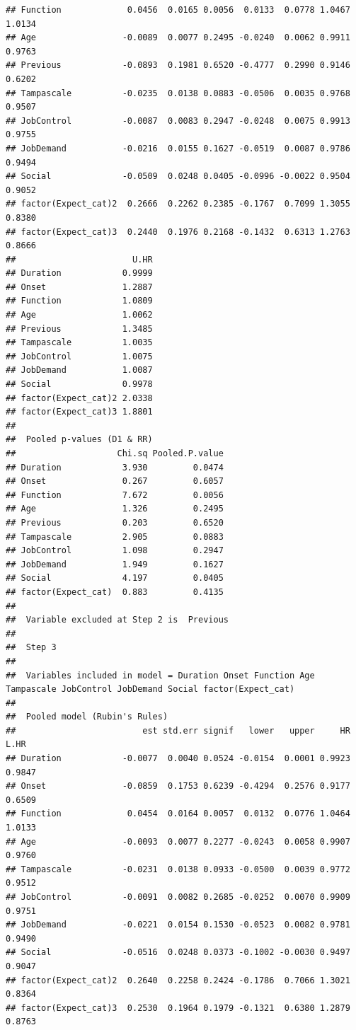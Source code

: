 \documentclass[]{book}
\begin{document}
\begin{verbatim}
## Function             0.0456  0.0165 0.0056  0.0133  0.0778 1.0467 1.0134
## Age                 -0.0089  0.0077 0.2495 -0.0240  0.0062 0.9911 0.9763
## Previous            -0.0893  0.1981 0.6520 -0.4777  0.2990 0.9146 0.6202
## Tampascale          -0.0235  0.0138 0.0883 -0.0506  0.0035 0.9768 0.9507
## JobControl          -0.0087  0.0083 0.2947 -0.0248  0.0075 0.9913 0.9755
## JobDemand           -0.0216  0.0155 0.1627 -0.0519  0.0087 0.9786 0.9494
## Social              -0.0509  0.0248 0.0405 -0.0996 -0.0022 0.9504 0.9052
## factor(Expect_cat)2  0.2666  0.2262 0.2385 -0.1767  0.7099 1.3055 0.8380
## factor(Expect_cat)3  0.2440  0.1976 0.2168 -0.1432  0.6313 1.2763 0.8666
##                       U.HR
## Duration            0.9999
## Onset               1.2887
## Function            1.0809
## Age                 1.0062
## Previous            1.3485
## Tampascale          1.0035
## JobControl          1.0075
## JobDemand           1.0087
## Social              0.9978
## factor(Expect_cat)2 2.0338
## factor(Expect_cat)3 1.8801
## 
##  Pooled p-values (D1 & RR) 
##                    Chi.sq Pooled.P.value
## Duration            3.930         0.0474
## Onset               0.267         0.6057
## Function            7.672         0.0056
## Age                 1.326         0.2495
## Previous            0.203         0.6520
## Tampascale          2.905         0.0883
## JobControl          1.098         0.2947
## JobDemand           1.949         0.1627
## Social              4.197         0.0405
## factor(Expect_cat)  0.883         0.4135
## 
##  Variable excluded at Step 2 is  Previous 
## 
##  Step 3 
## 
##  Variables included in model = Duration Onset Function Age Tampascale JobControl JobDemand Social factor(Expect_cat) 
## 
##  Pooled model (Rubin's Rules) 
##                         est std.err signif   lower   upper     HR   L.HR
## Duration            -0.0077  0.0040 0.0524 -0.0154  0.0001 0.9923 0.9847
## Onset               -0.0859  0.1753 0.6239 -0.4294  0.2576 0.9177 0.6509
## Function             0.0454  0.0164 0.0057  0.0132  0.0776 1.0464 1.0133
## Age                 -0.0093  0.0077 0.2277 -0.0243  0.0058 0.9907 0.9760
## Tampascale          -0.0231  0.0138 0.0933 -0.0500  0.0039 0.9772 0.9512
## JobControl          -0.0091  0.0082 0.2685 -0.0252  0.0070 0.9909 0.9751
## JobDemand           -0.0221  0.0154 0.1530 -0.0523  0.0082 0.9781 0.9490
## Social              -0.0516  0.0248 0.0373 -0.1002 -0.0030 0.9497 0.9047
## factor(Expect_cat)2  0.2640  0.2258 0.2424 -0.1786  0.7066 1.3021 0.8364
## factor(Expect_cat)3  0.2530  0.1964 0.1979 -0.1321  0.6380 1.2879 0.8763

\end{verbatim}
\end{document}
